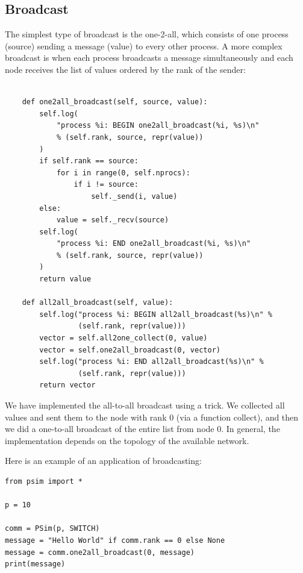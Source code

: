 \documentclass[justified, sixbynine]{tufte-book}
\def\ft{\small\tt}
\theoremstyle{plain}%
\newtheorem * {corollary}{Corollary}
\theoremstyle{definition}
\theoremstyle{remark}
\newtheorem * {remark}{Remark}
\newtheorem * {note}{Note}
\begin{document}
\begin{fullwidth}
\goodbreak\subsection{Broadcast}

The simplest type of broadcast is the one-2-all, which consists of one process (source) sending a message (value) to every other process. A more complex broadcast is when each process broadcasts a message simultaneously and each node receives the list of values ordered by the rank of the sender:

\begin{lstlisting}[caption={in file: {\ft psim.py}}]

    def one2all_broadcast(self, source, value):
        self.log(
            "process %i: BEGIN one2all_broadcast(%i, %s)\n"
            % (self.rank, source, repr(value))
        )
        if self.rank == source:
            for i in range(0, self.nprocs):
                if i != source:
                    self._send(i, value)
        else:
            value = self._recv(source)
        self.log(
            "process %i: END one2all_broadcast(%i, %s)\n"
            % (self.rank, source, repr(value))
        )
        return value

    def all2all_broadcast(self, value):
        self.log("process %i: BEGIN all2all_broadcast(%s)\n" %
                 (self.rank, repr(value)))
        vector = self.all2one_collect(0, value)
        vector = self.one2all_broadcast(0, vector)
        self.log("process %i: END all2all_broadcast(%s)\n" %
                 (self.rank, repr(value)))
        return vector
\end{lstlisting}

We have implemented the all-to-all broadcast using a trick. We collected all values and sent them to the node with rank 0 (via a function collect), and then we did a one-to-all broadcast of the entire list from node 0. In general, the implementation depends on the topology of the available network.

Here is an example of an application of broadcasting:

\begin{lstlisting}
from psim import * 

p = 10

comm = PSim(p, SWITCH)
message = "Hello World" if comm.rank == 0 else None
message = comm.one2all_broadcast(0, message)
print(message)
\end{lstlisting}


\end{fullwidth}
\end{document}
